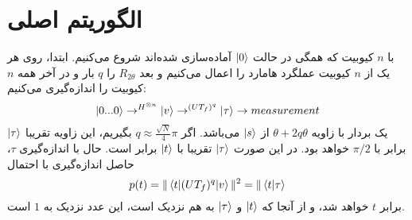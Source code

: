 \section{الگوریتم اصلی}
با $n$ کیوبیت که همگی در حالت $\ket{0}$ آماده‌سازی‌ شده‌اند شروع می‌کنیم. ابتدا، روی هر یک از $n$ کیوبیت عملگرد هامارد را اعمال می‌کنیم و بعد $R_{2 \theta}$ را $q$ بار و در آخر همه $n$ کیوبیت را اندازه‌گیری می‌کنیم: 
\begin{equation}
	\ket{0...0} \rightarrow^{H^{\otimes n}} \ket{v} \rightarrow^{(UT_{f})^{q}} \ket{\tau} \to measurement
\end{equation}
$\ket{\tau}$ یک بردار با زاویه $\theta + 2q\theta$ از $\ket{s}$ می‌باشد. اگر $q \approx \frac{\sqrt{N}}{4}\pi$ بگیریم، این زاویه تقریبا برابر با $\pi / 2$ خواهد بود. در این صورت  $\ket{\tau}$ تقریبا با $\ket{t}$ برابر است. حال با اندازه‌گیری $\tau$، حاصل اندازه‌گیری با احتمال 
\begin{equation}
	p(t) = \|\mel{t}{(UT_{f})^{q}}{v}\|^{2} = \|\braket{t}{\tau}
\end{equation}
برابر $t$ خواهد شد، و از آنجا که $\ket{t}$ و $\ket{\tau}$ به هم نزدیک است، این عدد نزدیک به $1$ است.